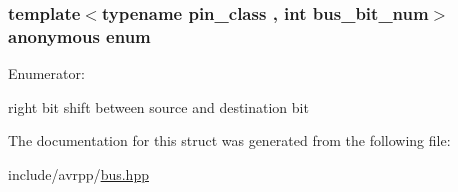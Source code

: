 \hypertarget{structavrpp_1_1bus_1_1bus__pin_a160c0079ea83d9388b22ba4354b6848c}{
\subsubsection[{"@7}]{\setlength{\rightskip}{0pt plus 5cm}template$<$typename pin\_\-class , int bus\_\-bit\_\-num$>$ anonymous enum}}
\label{structavrpp_1_1bus_1_1bus__pin_a160c0079ea83d9388b22ba4354b6848c}
\begin{Desc}
\item[Enumerator: ]\par
\begin{description}
\item[{\em 
\hypertarget{structavrpp_1_1bus_1_1bus__pin_a160c0079ea83d9388b22ba4354b6848ca4a1647e8ac04b525055aad4a2806fa1c}{
rshift}
\label{structavrpp_1_1bus_1_1bus__pin_a160c0079ea83d9388b22ba4354b6848ca4a1647e8ac04b525055aad4a2806fa1c}
}]right bit shift between source and destination bit \end{description}
\end{Desc}



The documentation for this struct was generated from the following file:\begin{DoxyCompactItemize}
\item 
include/avrpp/\hyperlink{bus_8hpp}{bus.hpp}\end{DoxyCompactItemize}
